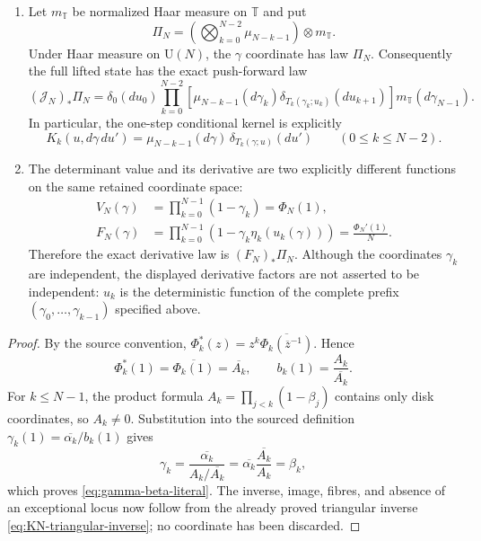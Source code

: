 \begin{sloppypar}
\begin{theorem}
\begin{enumerate}
 \item Let $m_{\mathbb T}$ be normalized Haar measure on $\mathbb T$ and put
 \begin{equation}
  \Pi_N=
  \left(\bigotimes_{k=0}^{N-2}\mu_{N-k-1}\right)\otimes m_{\mathbb T}.
  \label{eq:gamma-cue-product-law}
 \end{equation}
 Under Haar measure on $\mathrm U(N)$, the $\gamma$ coordinate has law $\Pi_N$.
 Consequently the full lifted state has the exact push-forward law
 \begin{equation}
  (\mathcal J_N)_*\Pi_N
  =\delta_0(du_0)
   \prod_{k=0}^{N-2}
   \left[
    \mu_{N-k-1}(d\gamma_k)
    \delta_{T_k(\gamma_k;u_k)}(du_{k+1})
   \right]
   m_{\mathbb T}(d\gamma_{N-1}).
  \label{eq:gamma-state-markov-kernel}
 \end{equation}
 In particular, the one-step conditional kernel is explicitly
 \begin{equation}
  K_k(u,d\gamma\,du')
  =\mu_{N-k-1}(d\gamma)\,
   \delta_{T_k(\gamma;u)}(du')
  \qquad(0\leq k\leq N-2).
  \label{eq:gamma-one-step-kernel}
 \end{equation}

 \item The determinant value and its derivative are two explicitly different
 functions on the same retained coordinate space:
 \begin{align}
  V_N(\gamma)&=\prod_{k=0}^{N-1}(1-\gamma_k)=\Phi_N(1),
  \label{eq:gamma-value-map}\\
  F_N(\gamma)&=\prod_{k=0}^{N-1}
   \left(1-\gamma_k\eta_k(u_k(\gamma))\right)
   =\frac{\Phi_N'(1)}{N}.
  \label{eq:gamma-derivative-map}
 \end{align}
 Therefore the exact derivative law is $(F_N)_*\Pi_N$.  Although the coordinates
 $\gamma_k$ are independent, the displayed derivative factors are not asserted to be
 independent: $u_k$ is the deterministic function of the complete prefix
 $(\gamma_0,\ldots,\gamma_{k-1})$ specified above.
\end{enumerate}
\end{theorem}

\begin{proof}
By the source convention,
$\Phi_k^*(z)=z^k\overline{\Phi_k(\overline z^{-1})}$.  Hence
\begin{equation}
 \Phi_k^*(1)=\overline{\Phi_k(1)}=\overline{A_k},
 \qquad
 b_k(1)=\frac{A_k}{\overline{A_k}}.
\end{equation}
For $k\leq N-1$, the product formula
$A_k=\prod_{j<k}(1-\beta_j)$ contains only disk coordinates, so $A_k\ne0$.
Substitution into the sourced definition
$\gamma_k(1)=\overline{\alpha_k}/b_k(1)$ gives
\begin{equation}
 \gamma_k
 =\frac{\overline{\alpha_k}}{A_k/\overline{A_k}}
 =\overline{\alpha_k}\frac{\overline{A_k}}{A_k}
 =\beta_k,
\end{equation}
which proves \eqref{eq:gamma-beta-literal}.  The inverse, image, fibres, and absence
of an exceptional locus now follow from the already proved triangular inverse
\eqref{eq:KN-triangular-inverse}; no coordinate has been discarded.


\end{proof}
\end{sloppypar}
